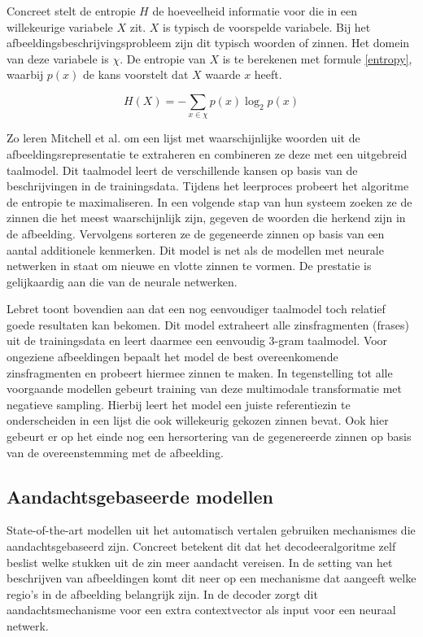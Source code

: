 Concreet stelt de entropie $H$ de hoeveelheid informatie voor die in een willekeurige variabele $X$ zit. $X$ is typisch de voorspelde variabele. Bij het afbeeldingsbeschrijvingsprobleem zijn dit typisch woorden of zinnen. Het domein van deze variabele is $\chi$. De entropie van $X$ is te berekenen met formule \eqref{entropy}, waarbij $p(x)$ de kans voorstelt dat $X$ waarde $x$ heeft\cite{Jurafsky:2009:SLP:1214993}. 

\begin{equation}
     H(X) = -\sum_{x \in \chi}p(x)\log_2p(x)
     \label{entropy}
 \end{equation} 

Zo leren Mitchell et al.\cite{Mitchell2015} om een lijst met waarschijnlijke woorden uit de afbeeldingsrepresentatie te extraheren en combineren ze deze met een uitgebreid taalmodel. Dit taalmodel leert de verschillende kansen op basis van de beschrijvingen in de trainingsdata. Tijdens het leerproces probeert het algoritme de entropie te maximaliseren. In een volgende stap van hun systeem zoeken ze de zinnen die het meest waarschijnlijk zijn, gegeven de woorden die herkend zijn in de afbeelding. Vervolgens sorteren ze de gegeneerde zinnen op basis van een aantal additionele kenmerken. Dit model is net als de modellen met neurale netwerken in staat om nieuwe en vlotte zinnen te vormen. De prestatie is gelijkaardig aan die van de neurale netwerken.

Lebret\cite{Lebret2015} toont bovendien aan dat een nog eenvoudiger taalmodel toch relatief goede resultaten kan bekomen. Dit model extraheert alle zinsfragmenten (frases) uit de trainingsdata en leert daarmee een eenvoudig 3-gram taalmodel. Voor ongeziene afbeeldingen bepaalt het model de best overeenkomende zinsfragmenten en probeert hiermee zinnen te maken. In tegenstelling tot alle voorgaande modellen gebeurt training van deze multimodale transformatie met negatieve sampling. Hierbij leert het model een juiste referentiezin te onderscheiden in een lijst die ook willekeurig gekozen zinnen bevat. Ook hier gebeurt er op het einde nog een hersortering van de gegenereerde zinnen op basis van de overeenstemming met de afbeelding.

\subsection{Aandachtsgebaseerde modellen}
State-of-the-art modellen uit het automatisch vertalen gebruiken mechanismes die aandachtsgebaseerd zijn. Concreet betekent dit dat het decodeeralgoritme zelf beslist welke stukken uit de zin meer aandacht vereisen.
In de setting van het beschrijven van afbeeldingen komt dit neer op een mechanisme dat aangeeft welke regio's in de afbeelding belangrijk zijn. In de decoder zorgt dit aandachtsmechanisme voor een extra contextvector als input voor een neuraal netwerk. 

